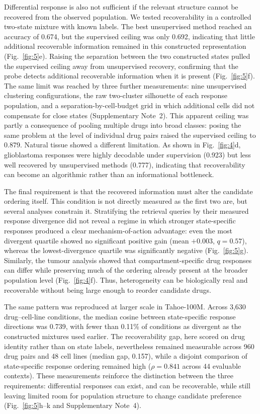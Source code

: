 \documentclass[11pt,letterpaper]{article}
\begin{document}
Differential response is also not sufficient if the relevant structure cannot be recovered from the observed population. We tested recoverability in a controlled two-state mixture with known labels. The best unsupervised method reached an accuracy of 0.674, but the supervised ceiling was only 0.692, indicating that little additional recoverable information remained in this constructed representation (Fig.~\ref{fig:5}e). Raising the separation between the two constructed states pulled the supervised ceiling away from unsupervised recovery, confirming that the probe detects additional recoverable information when it is present (Fig.~\ref{fig:5}f). The same limit was reached by three further measurements: nine unsupervised clustering configurations, the raw two-cluster silhouette of each response population, and a separation-by-cell-budget grid in which additional cells did not compensate for close states (Supplementary Note~2). This apparent ceiling was partly a consequence of pooling multiple drugs into broad classes: posing the same problem at the level of individual drug pairs raised the supervised ceiling to 0.879. Natural tissue showed a different limitation. As shown in Fig.~\ref{fig:4}d, glioblastoma responses were highly decodable under supervision (0.923) but less well recovered by unsupervised methods (0.777), indicating that recoverability can become an algorithmic rather than an informational bottleneck.

The final requirement is that the recovered information must alter the candidate ordering itself. This condition is not directly measured as the first two are, but several analyses constrain it. Stratifying the retrieval queries by their measured response divergence did not reveal a regime in which stronger state-specific responses produced a clear mechanism-of-action advantage: even the most divergent quartile showed no significant positive gain (mean $+0.003$, $q=0.57$), whereas the lowest-divergence quartile was significantly negative (Fig.~\ref{fig:5}g). Similarly, the tumour analysis showed that compartment-specific drug responses can differ while preserving much of the ordering already present at the broader population level (Fig.~\ref{fig:4}f). Thus, heterogeneity can be biologically real and recoverable without being large enough to reorder candidate drugs.

The same pattern was reproduced at larger scale in Tahoe-100M\cite{Tahoe100M}. Across 3,630 drug--cell-line conditions, the median cosine between state-specific response directions was 0.739, with fewer than 0.11\% of conditions as divergent as the constructed mixtures used earlier. The recoverability gap, here scored on drug identity rather than on state labels, nevertheless remained measurable across 960 drug pairs and 48 cell lines (median gap, 0.157), while a disjoint comparison of state-specific response ordering remained high ($\rho=0.841$ across 44 evaluable contexts). These measurements reinforce the distinction between the three requirements: differential responses can exist, and can be recoverable, while still leaving limited room for population structure to change candidate preference (Fig.~\ref{fig:5}h--k and Supplementary Note~4).
\end{document}
